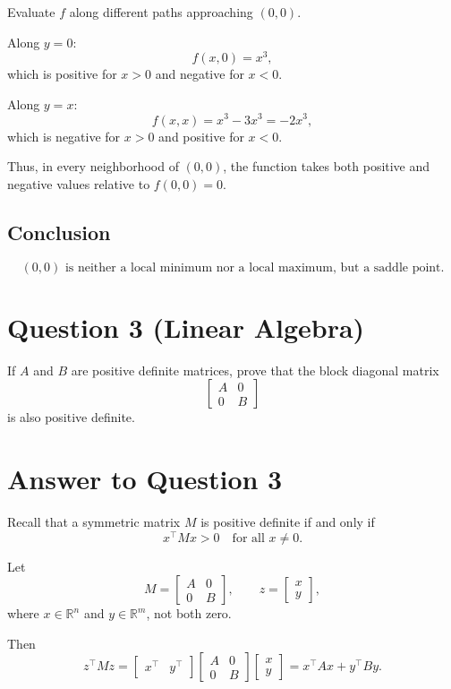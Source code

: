 \documentclass{article}
\begin{document}
Evaluate $f$ along different paths approaching $(0,0)$.

Along $y=0$:
\[
f(x,0)=x^3,
\]
which is positive for $x>0$ and negative for $x<0$.

Along $y=x$:
\[
f(x,x)=x^3-3x^3=-2x^3,
\]
which is negative for $x>0$ and positive for $x<0$.

Thus, in every neighborhood of $(0,0)$, the function takes both positive and negative values relative to $f(0,0)=0$.

\subsection*{Conclusion}
\[
(0,0)\text{ is neither a local minimum nor a local maximum, but a saddle point.}
\]

\newpage
\section*{Question 3 (Linear Algebra)}

If $A$ and $B$ are positive definite matrices, prove that the block diagonal matrix
\[
\begin{bmatrix}
A & 0 \\
0 & B
\end{bmatrix}
\]
is also positive definite.

\section*{Answer to Question 3}

Recall that a symmetric matrix $M$ is positive definite if and only if
\[
x^\top M x > 0 \quad \text{for all } x \neq 0.
\]

Let
\[
M =
\begin{bmatrix}
A & 0 \\
0 & B
\end{bmatrix},
\qquad
z =
\begin{bmatrix}
x \\
y
\end{bmatrix},
\]
where $x \in \mathbb{R}^n$ and $y \in \mathbb{R}^m$, not both zero.

Then
\[
z^\top M z
=
\begin{bmatrix}
x^\top & y^\top
\end{bmatrix}
\begin{bmatrix}
A & 0 \\
0 & B
\end{bmatrix}
\begin{bmatrix}
x \\
y
\end{bmatrix}
=
x^\top A x + y^\top B y.
\]
\end{document}
